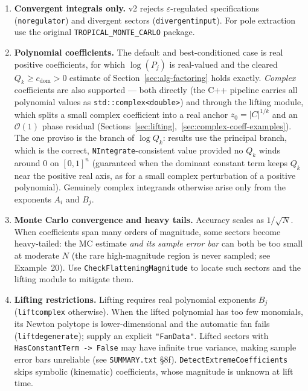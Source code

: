 \documentclass[11pt,a4paper]{article}
\begin{document}
\begin{enumerate}
  \item \textbf{Convergent integrals only.} v2 rejects $\varepsilon$-regulated specifications (\texttt{noregulator}) and divergent sectors (\texttt{divergentinput}). For pole extraction use the original \texttt{TROPICAL\_MONTE\_CARLO} package.

  \item \textbf{Polynomial coefficients.} The default and best-conditioned case is real positive coefficients, for which $\log(P_j)$ is real-valued and the cleared $Q_k \geq c_{\mathrm{dom}} > 0$ estimate of Section~\ref{sec:alg-factoring} holds exactly. \emph{Complex} coefficients are also supported --- both directly (the C++ pipeline carries all polynomial values as \texttt{std::complex<double>}) and through the lifting module, which splits a small complex coefficient into a real anchor $z_0 = |C|^{1/k}$ and an $\mathcal{O}(1)$ phase residual (Sections~\ref{sec:lifting},~\ref{sec:complex-coeff-examples}). The one proviso is the branch of $\log Q_k$: results use the principal branch, which is the correct, \texttt{NIntegrate}-consistent value provided no $Q_k$ winds around $0$ on $[0,1]^n$ (guaranteed when the dominant constant term keeps $Q_k$ near the positive real axis, as for a small complex perturbation of a positive polynomial). Genuinely complex integrands otherwise arise only from the exponents $A_i$ and $B_j$.

  \item \textbf{Monte Carlo convergence and heavy tails.} Accuracy scales as $1/\sqrt{N}$. When coefficients span many orders of magnitude, some sectors become heavy-tailed: the MC estimate \emph{and its sample error bar} can both be too small at moderate $N$ (the rare high-magnitude region is never sampled; see Example~20). Use \texttt{CheckFlatteningMagnitude} to locate such sectors and the lifting module to mitigate them.

  \item \textbf{Lifting restrictions.} Lifting requires real polynomial exponents $B_j$ (\texttt{liftcomplex} otherwise). When the lifted polynomial has too few monomials, its Newton polytope is lower-dimensional and the automatic fan fails (\texttt{liftdegenerate}); supply an explicit \texttt{"FanData"}. Lifted sectors with \texttt{HasConstantTerm -> False} may have infinite true variance, making sample error bars unreliable (see \texttt{SUMMARY.txt} \S8f). \texttt{DetectExtremeCoefficients} skips symbolic (kinematic) coefficients, whose magnitude is unknown at lift time.


\end{enumerate}
\end{document}
